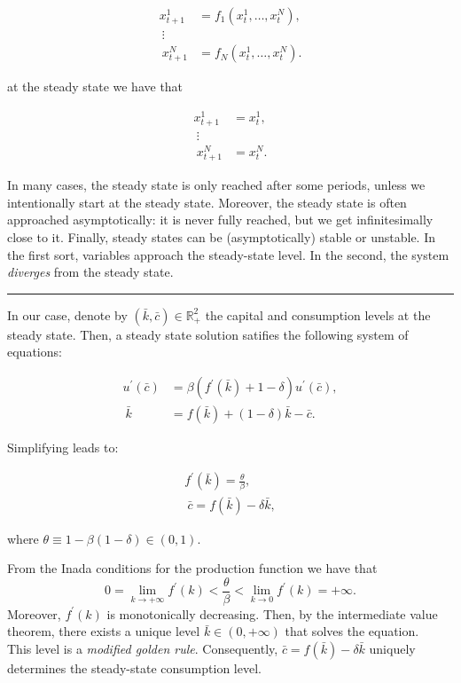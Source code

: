 \documentclass[11pt,a4paper,english]{article}
\begin{document}
\begin{eqnarray}
x^{1}_{t+1} & = f_{1}(x^{1}_{t}, \ldots, x^{N}_{t}), \\\
\vdots & \\\
x^{N}_{t+1} & = f_{N}(x^{1}_{t}, \ldots, x^{N}_{t}).
\end{eqnarray}

at the steady state we have that

\begin{eqnarray}
x^{1}_{t+1} & = x^{1}_{t}, \\\
\vdots & \\\
x^{N}_{t+1} & = x^{N}_{t}.
\end{eqnarray}

In many cases, the steady state is only reached after some periods,
unless we intentionally start at the steady state. Moreover, the steady
state is often approached asymptotically: it is never fully reached, but
we get infinitesimally close to it. Finally, steady states can be
(asymptotically) stable or unstable. In the first sort, variables
approach the steady-state level. In the second, the system
\emph{diverges} from the steady state.

\begin{center}\rule{0.5\linewidth}{\linethickness}\end{center}

In our case, denote by \((\bar{k}, \bar{c}) \in \mathbb{R}_{+}^{2}\) the
capital and consumption levels at the steady state. Then, a steady state
solution satifies the following system of equations:

\begin{eqnarray}
u^{\prime}(\bar{c}) & = \beta (f^{\prime}(\bar{k}) + 1 -\delta) u^{\prime}(\bar{c}), \\\
\bar{k} & = f(\bar{k}) + (1-\delta) \bar{k} - \bar{c}.
\end{eqnarray}

Simplifying leads to:

\begin{eqnarray}
f^{\prime}(\bar{k})  = \frac{\theta}{\beta}, \\\
\bar{c}  = f(\bar{k}) - \delta \bar{k},
\end{eqnarray}

where \(\theta \equiv 1 - \beta(1-\delta) \in (0,1).\)

From the Inada conditions for the production function we have that
\[0 = \lim_{k \rightarrow +\infty} f^{\prime}(k) < \frac{\theta}{\beta} < \lim_{k \rightarrow 0}f^{\prime}(k) = +\infty.\]
Moreover, \(f^{\prime}(k)\) is monotonically decreasing. Then, by the
intermediate value theorem, there exists a unique level
\(\bar{k} \in (0, +\infty)\) that solves the equation.\\
This level is a \emph{modified golden rule}. Consequently,
\(\bar{c} = f(\bar{k}) - \delta \bar{k}\) uniquely determines the
steady-state consumption level.
\end{document}
